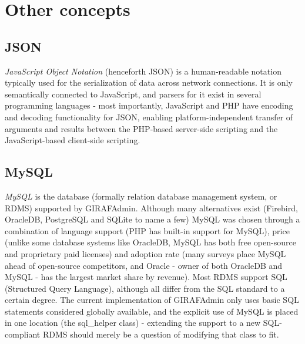 \section{Other concepts}

\subsection{JSON}
\textit{JavaScript Object Notation} (henceforth JSON) is a human-readable notation typically used for the serialization of data across network connections. It is only semantically connected to JavaScript, and parsers for it exist in several programming languages - most importantly, JavaScript and PHP have encoding and decoding functionality for JSON, enabling platform-independent transfer of arguments and results between the PHP-based server-side scripting and the JavaScript-based client-side scripting.

\subsection{MySQL}
\textit{MySQL} is the database (formally relation database management system, or RDMS) supported by GIRAFAdmin. Although many alternatives exist (Firebird, OracleDB, PostgreSQL and SQLite to name a few) MySQL was chosen through a combination of language support (PHP has built-in support for MySQL), price (unlike some database systems like OracleDB, MySQL has both free open-source and proprietary paid licenses) and adoption rate (many surveys place MySQL ahead of open-source competitors, and Oracle - owner of both OracleDB and MySQL - has the largest market share by revenue). Most RDMS support SQL (Structured Query Language), although all differ from the SQL standard to a certain degree. The current implementation of GIRAFAdmin only uses basic SQL statements considered globally available, and the explicit use of MySQL is placed in one location (the sql\_helper class) - extending the support to a new SQL-compliant RDMS should merely be a question of modifying that class to fit.

